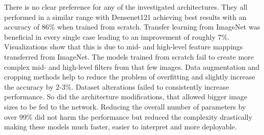 \documentclass[11pt,a4paper,twoside,hidelinks,openright]{rvsmaster}
\begin{document}

\vspace{3mm} %

There is no clear preference for any of the investigated architectures. They all performed in a similar range with Densenet121 achieving best results with an accuracy of 86\% when trained from scratch. Transfer learning from ImageNet was beneficial in every single case leading to an improvement of roughly 7\%. Visualizations show that this is due to mid- and high-level feature mappings transferred from ImageNet. The models trained from scratch fail to create more complex mid- and high-level filters from that few images. Data augmentation and cropping methods help to reduce the problem of overfitting and slightly increase the accuracy by 2-3\%. Dataset alterations failed to consistently increase performance. So did the architecture modifications, that allowed bigger image sizes to be fed to the network. Reducing the overall number of parameters by over 99\% did not harm the performance but reduced the complexity drastically making these models much faster, easier to interpret and more deployable.
 
\end{document}
